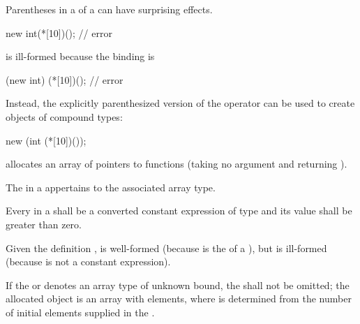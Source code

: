 \pnum
\begin{note}
%
Parentheses in a  of a 
can have surprising effects.
\begin{example}
\begin{codeblock}
new int(*[10])();               // error
\end{codeblock}
is ill-formed because the binding is
\begin{codeblock}
(new int) (*[10])();            // error
\end{codeblock}

Instead, the explicitly parenthesized version of the 
operator can be used to create objects of compound
types:

\begin{codeblock}
new (int (*[10])());
\end{codeblock}
allocates an array of  pointers to functions (taking no
argument and returning ).
\end{example}
\end{note}

\pnum
The  in a  appertains
to the associated array type.

\pnum
Every  in a
 shall be a converted constant
expression of type  and
its value shall be greater than zero.
\begin{example}
Given the definition ,
 is well-formed (because  is the
 of a ), but
 is ill-formed (because  is not a
constant expression).
\end{example}

\pnum
If the  or 
denotes an array type of unknown bound,
the  shall not be omitted;
the allocated object is an array with  elements,
where  is determined from the number of initial elements
supplied in
the .

